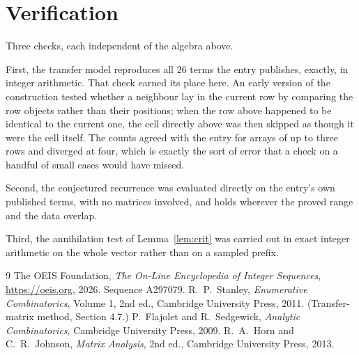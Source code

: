 \documentclass[11pt,a4paper]{article}
\theoremstyle{plain}
\theoremstyle{definition}
\begin{document}
\section{Verification}

Three checks, each independent of the algebra above.

First, the transfer model reproduces all $26$ terms the entry publishes, exactly, in
integer arithmetic. That check earned its place here. An early version of the construction
tested whether a neighbour lay in the current row by comparing the row objects rather
than their positions; when the row above happened to be identical to the current one, the
cell directly above was then skipped as though it were the cell itself. The counts agreed with
the entry for arrays of up to three rows and diverged at four, which is exactly the sort of
error that a check on a handful of small cases would have missed.

Second, the conjectured recurrence was evaluated directly on the entry's own published terms,
with no matrices involved, and holds wherever the proved range and the data overlap.

Third, the annihilation test of Lemma~\ref{lem:crit} was carried out in exact integer
arithmetic on the whole vector rather than on a sampled prefix.

\begin{thebibliography}{9}
 The OEIS Foundation, \emph{The On-Line Encyclopedia of Integer
Sequences}, \url{https://oeis.org}, 2026. Sequence A297079.
 R.~P.~Stanley, \emph{Enumerative Combinatorics}, Volume 1, 2nd ed.,
Cambridge University Press, 2011. (Transfer-matrix method, Section 4.7.)
 P.~Flajolet and R.~Sedgewick, \emph{Analytic Combinatorics}, Cambridge
University Press, 2009.
 R.~A.~Horn and C.~R.~Johnson, \emph{Matrix Analysis}, 2nd ed., Cambridge
University Press, 2013.
\end{thebibliography}
\end{document}
